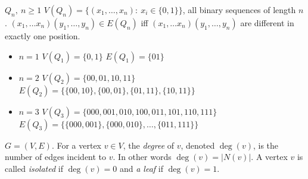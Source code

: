 \begin{example}
$Q_n,\ n\geq 1$\newline
$V(Q_n)=\{(x_1,\dots,x_n):\ x_i\in\{0,1\}\}$, all binary sequences of length $n$.\newline
$(x_1,\dots x_n)(y_1,\dots,y_n)\in E(Q_n)$ iff $(x_1,\dots x_n)(y_1,\dots,y_n)$ are different in exactly one position.\newline
\begin{itemize}
    \item $n=1$\newline
    $V(Q_1)=\{0,1\}$\newline
    $E(Q_1)=\{01\}$
    \item $n=2$\newline
    $V(Q_2)=\{00,01,10,11\}$\newline
    $E(Q_2)=\{\{00,10\},\{00,01\},\{01,11\},\{10,11\}\}$
    \item $n=3$\newline
    $V(Q_3)=\{000,001,010,100,011,101,110,111\}$\newline
    $E(Q_3)=\{\{000,001\},\{000,010\},\dots,\{011,111\}\}$
\end{itemize}
\end{example}

\begin{definition}
$G=(V,E)$. For a vertex $v\in V$, the \emph{degree} of $v$, denoted $\deg(v)$, is the number of edges incident to $v$. In other words $\deg(v)=|N(v)|$. A vertex $v$ is called \emph{isolated} if $\deg(v)=0$ and \emph{a leaf} if $\deg(v)=1$.
\end{definition}

